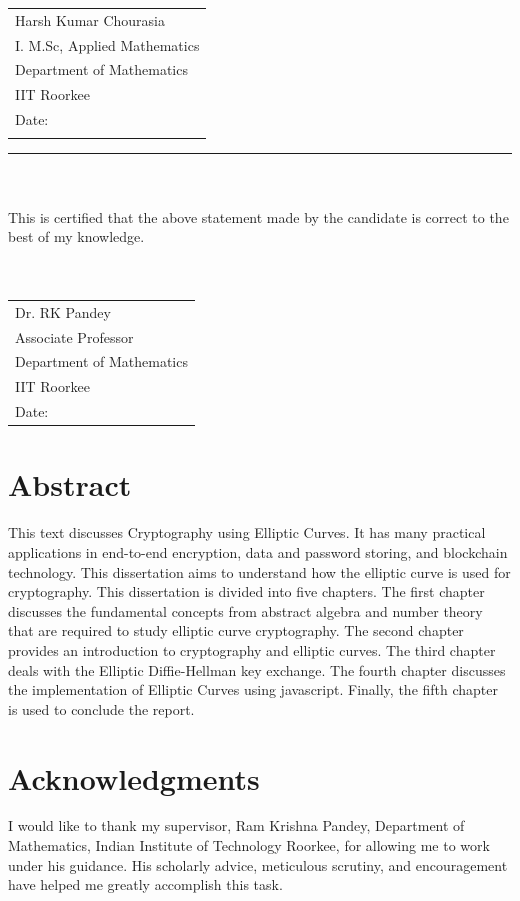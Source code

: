 \documentclass[a4paper,12pt]{report}
\begin{document}
\begin{tabular}{l}
	Harsh Kumar Chourasia        \\
	I. M.Sc, Applied Mathematics \\
	Department of Mathematics    \\
	IIT Roorkee                  \\
	Date:                        \\
	\bigskip
\end{tabular}

\hrule
\bigskip
\bigskip
{} \\\\
This is certified that the above statement made by the candidate is  correct to the best of my knowledge.\\\\\\
\vspace{1cm}
\begin{tabular}{l}
	Dr. RK Pandey             \\
	Associate Professor       \\
	Department of Mathematics \\
	IIT Roorkee               \\
	Date:                     \\
\end{tabular}
\cleardoublepage
\section*{Abstract}
This text discusses Cryptography using Elliptic Curves. It has many practical applications in end-to-end encryption, data and password storing, and blockchain technology. This dissertation aims to understand how the elliptic curve is used for cryptography. This dissertation is divided into five chapters. The first chapter discusses the fundamental concepts from abstract algebra and number theory that are required to study elliptic curve cryptography. The second chapter provides an introduction to cryptography and elliptic curves. The third chapter deals with the Elliptic Diffie-Hellman key exchange. The fourth chapter discusses the implementation of Elliptic Curves using javascript. Finally, the fifth chapter is used to conclude the report.
\cleardoublepage
\section*{Acknowledgments}
I would like to thank my supervisor, Ram Krishna Pandey, Department
of Mathematics, Indian Institute of Technology Roorkee, for allowing me to work under his guidance. His scholarly advice, meticulous scrutiny, and encouragement have helped me greatly accomplish this task.
\end{document}
